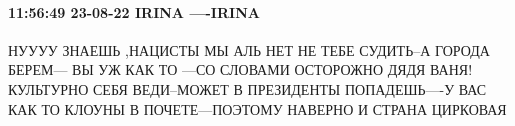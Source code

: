 
 
 
 
 

\paragraph{11:56:49 23-08-22 IRINA ----IRINA}

НУУУУ ЗНАЕШЬ ,НАЦИСТЫ МЫ АЛЬ НЕТ НЕ ТЕБЕ СУДИТЬ--А ГОРОДА БЕРЕМ--- ВЫ УЖ КАК ТО ---СО СЛОВАМИ ОСТОРОЖНО ДЯДЯ ВАНЯ! КУЛЬТУРНО СЕБЯ ВЕДИ--МОЖЕТ В ПРЕЗИДЕНТЫ ПОПАДЕШЬ----У ВАС КАК ТО КЛОУНЫ В ПОЧЕТЕ---ПОЭТОМУ НАВЕРНО И СТРАНА ЦИРКОВАЯ
